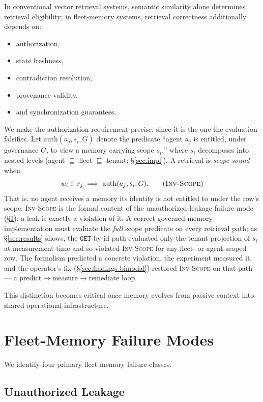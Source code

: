 \documentclass[10pt,twocolumn,letterpaper]{article}
\begin{document}
In conventional vector retrieval systems, semantic similarity alone determines retrieval eligibility; in fleet-memory systems, retrieval correctness additionally depends on:
\begin{itemize}
    \item authorization,
    \item state freshness,
    \item contradiction resolution,
    \item provenance validity,
    \item and synchronization guarantees.
\end{itemize}

We make the authorization requirement precise, since it is the one the
evaluation falsifies. Let \(\mathrm{auth}(a_j, s_i, G)\) denote the predicate
``agent \(a_j\) is entitled, under governance \(G\), to view a memory carrying
scope \(s_i\),'' where \(s_i\) decomposes into nested levels (agent
\(\sqsubseteq\) fleet \(\sqsubseteq\) tenant; \S\ref{sec:impl}). A retrieval is
\emph{scope-sound} when
\[
w_i \in r_j \;\Longrightarrow\; \mathrm{auth}(a_j, s_i, G).
\tag{\textsc{Inv-Scope}}
\]
That is, no agent receives a memory its identity is not entitled to under the
row's scope. \textsc{Inv-Scope} is the formal content of the unauthorized-leakage
failure mode (\S\ref{sec:failures}): a leak is exactly a violation of it. A
correct governed-memory implementation must evaluate the \emph{full} scope
predicate on every retrieval path; as \S\ref{sec:results} shows, the
\(\mathtt{GET}\)-by-id path evaluated only the tenant projection of \(s_i\) at
measurement time and so violated \textsc{Inv-Scope} for any fleet- or
agent-scoped row. The formalism predicted a concrete violation, the experiment
measured it, and the operator's fix (\S\ref{sec:findings-bimodal}) restored
\textsc{Inv-Scope} on that path --- a predict\(\to\)measure\(\to\)remediate loop.

This distinction becomes critical once memory evolves from passive context into shared operational infrastructure.

\section{Fleet-Memory Failure Modes}
\label{sec:failures}

We identify four primary fleet-memory failure classes.

\subsection{Unauthorized Leakage}
\end{document}
